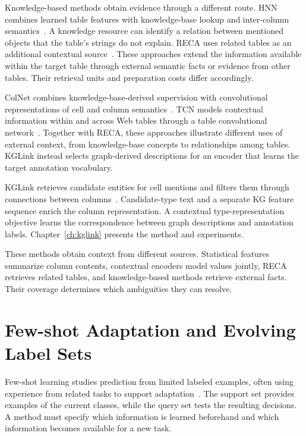 Knowledge-based methods obtain evidence through a different route. HNN combines learned table features with knowledge-base lookup and inter-column semantics~\cite{bg-hnn}. A knowledge resource can identify a relation between mentioned objects that the table's strings do not explain. RECA uses related tables as an additional contextual source~\cite{bg-reca}. These approaches extend the information available within the target table through external semantic facts or evidence from other tables. Their retrieval units and preparation costs differ accordingly.

ColNet combines knowledge-base-derived supervision with convolutional representations of cell and column semantics~\cite{lit-chen2019colnet}. TCN models contextual information within and across Web tables through a table convolutional network~\cite{lit-wang2021tcn}. Together with RECA, these approaches illustrate different uses of external context, from knowledge-base concepts to relationships among tables. KGLink instead selects graph-derived descriptions for an encoder that learns the target annotation vocabulary.

KGLink retrieves candidate entities for cell mentions and filters them through connections between columns~\cite{bg-kglink}. Candidate-type text and a separate KG feature sequence enrich the column representation. A contextual type-representation objective learns the correspondence between graph descriptions and annotation labels. Chapter~\ref{ch:kglink} presents the method and experiments.

These methods obtain context from different sources. Statistical features summarize column contents, contextual encoders model values jointly, RECA retrieves related tables, and knowledge-based methods retrieve external facts. Their coverage determines which ambiguities they can resolve.

\section{Few-shot Adaptation and Evolving Label Sets}
\label{sec:background:fewshot}

Few-shot learning studies prediction from limited labeled examples, often using experience from related tasks to support adaptation~\cite{lit-wang2020generalizing}. The support set provides examples of the current classes, while the query set tests the resulting decisions. A method must specify which information is learned beforehand and which information becomes available for a new task.

